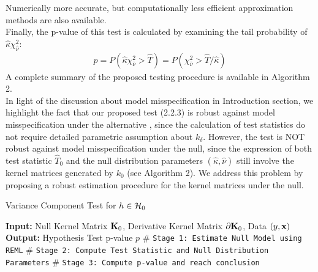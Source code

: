\documentclass[11pt]{article}
\begin{document}
Numerically more accurate, but computationally less efficient approximation methods are also available.\\
Finally, the p-value of this test is calculated by examining the tail probability of $\hat{\kappa} \chi_{\hat{\nu}}^2$:
\begin{align*}
p=P(\hat{\kappa} \chi_{\hat{\nu}}^2>\hat{T})=P(\chi_{\hat{\nu}}^2>\hat{T}/\hat{\kappa})
\end{align*}
A complete summary of the proposed testing procedure is available in Algorithm 2.\\
In light of the discussion about model misspecification in Introduction section, we highlight the fact that our proposed test (2.2.3) is robust against model misspecification under the alternative \citep{lin_variance_1997}, since the calculation of test statistics do not require detailed parametric assumption about $k_\delta$. However, the test is NOT robust against model misspecification under the null, since the expression of both test statistic $\hat{T}_0$ and the null distribution parameters $(\hat{\kappa}, \hat{\nu})$ still involve the kernel matrices generated by $k_0$ (see Algorithm 2). We address this problem by proposing a robust estimation procedure for the kernel matrices under the null.

\begin{algorithm}
\caption{Variance Component Test for $h \in {\cal H}_0$} 
\label{alg:cvek}
\begin{algorithmic}[1]
\newline
\textbf{Input:} Null Kernel Matrix ${\bf K}_0$, Derivative Kernel Matrix $\partial {\bf K}_0$, Data $(y, {\bf x})$\newline
\textbf{Output:} Hypothesis Test p-value $p$\newline
$\#$ \texttt{Stage 1: Estimate Null Model using REML}
\newline
$\#$ \texttt{Stage 2: Compute Test Statistic and Null Distribution Parameters}
\newline
$\#$ \texttt{Stage 3: Compute p-value and reach conclusion}
\EndProcedure
\end{algorithmic}
\end{algorithm}
\end{document}
